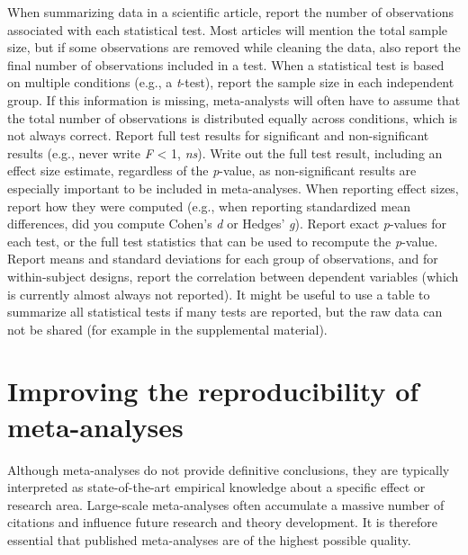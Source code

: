 \documentclass[
  oneside]{book}
\begin{document}
When summarizing data in a scientific article, report the number of observations associated with each statistical test. Most articles will mention the total sample size, but if some observations are removed while cleaning the data, also report the final number of observations included in a test. When a statistical test is based on multiple conditions (e.g., a \emph{t}-test), report the sample size in each independent group. If this information is missing, meta-analysts will often have to assume that the total number of observations is distributed equally across conditions, which is not always correct. Report full test results for significant and non-significant results (e.g., never write \emph{F} \textless{} 1, \emph{ns}). Write out the full test result, including an effect size estimate, regardless of the \emph{p}-value, as non-significant results are especially important to be included in meta-analyses. When reporting effect sizes, report how they were computed (e.g., when reporting standardized mean differences, did you compute Cohen's \emph{d} or Hedges' \emph{g}). Report exact \emph{p}-values for each test, or the full test statistics that can be used to recompute the \emph{p}-value. Report means and standard deviations for each group of observations, and for within-subject designs, report the correlation between dependent variables (which is currently almost always not reported). It might be useful to use a table to summarize all statistical tests if many tests are reported, but the raw data can not be shared (for example in the supplemental material).

\hypertarget{metareporting}{%
\section{Improving the reproducibility of meta-analyses}\label{metareporting}}

Although meta-analyses do not provide definitive conclusions, they are typically interpreted as state-of-the-art empirical knowledge about a specific effect or research area. Large-scale meta-analyses often accumulate a massive number of citations and influence future research and theory development. It is therefore essential that published meta-analyses are of the highest possible quality.
\end{document}
